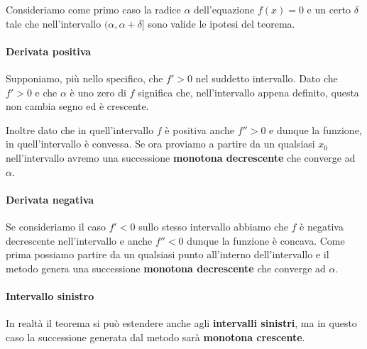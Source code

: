 Consideriamo come primo caso la radice $\alpha$ dell'equazione $f(x) = 0$ e un certo $\delta$ tale che
nell'intervallo $(\alpha, \alpha + \delta]$ sono valide le ipotesi del teorema.

\paragraph{Derivata positiva} Supponiamo, più nello specifico, che $f' > 0$ nel suddetto intervallo. Dato che
$f' > 0$ e che $\alpha$ è uno zero di $f$ significa che, nell'intervallo appena definito, questa non cambia
segno ed è crescente.

Inoltre dato che in quell'intervallo $f$ è positiva anche $f'' > 0$ e dunque la funzione, in quell'intervallo è
convessa. Se ora proviamo a partire da un qualsiasi $x_0$ nell'intervallo avremo una successione
\textbf{monotona decrescente} che converge ad $\alpha$.

\paragraph{Derivata negativa} Se consideriamo il caso $f' < 0$ sullo stesso intervallo abbiamo che $f$ è negativa
decrescente nell'intervallo e anche $f'' < 0$ dunque la funzione è concava. Come prima possiamo partire da un
qualsiasi punto all'interno dell'intervallo e il metodo genera una successione \textbf{monotona decrescente} che
converge ad $\alpha$.

\paragraph{Intervallo sinistro}
In realtà il teorema si può estendere anche agli \textbf{intervalli sinistri}, ma in questo caso la successione
generata dal metodo sarà \textbf{monotona crescente}.

